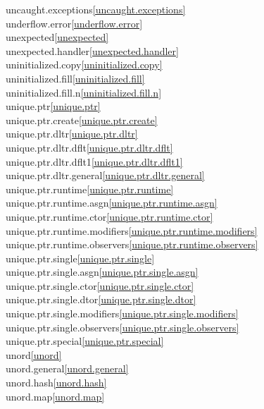 \begin{multicols}{2}
uncaught.exceptions\quad\ref{uncaught.exceptions}\\
underflow.error\quad\ref{underflow.error}\\
unexpected\quad\ref{unexpected}\\
unexpected.handler\quad\ref{unexpected.handler}\\
uninitialized.copy\quad\ref{uninitialized.copy}\\
uninitialized.fill\quad\ref{uninitialized.fill}\\
uninitialized.fill.n\quad\ref{uninitialized.fill.n}\\
unique.ptr\quad\ref{unique.ptr}\\
unique.ptr.create\quad\ref{unique.ptr.create}\\
unique.ptr.dltr\quad\ref{unique.ptr.dltr}\\
unique.ptr.dltr.dflt\quad\ref{unique.ptr.dltr.dflt}\\
unique.ptr.dltr.dflt1\quad\ref{unique.ptr.dltr.dflt1}\\
unique.ptr.dltr.general\quad\ref{unique.ptr.dltr.general}\\
unique.ptr.runtime\quad\ref{unique.ptr.runtime}\\
unique.ptr.runtime.asgn\quad\ref{unique.ptr.runtime.asgn}\\
unique.ptr.runtime.ctor\quad\ref{unique.ptr.runtime.ctor}\\
unique.ptr.runtime.modifiers\quad\ref{unique.ptr.runtime.modifiers}\\
unique.ptr.runtime.observers\quad\ref{unique.ptr.runtime.observers}\\
unique.ptr.single\quad\ref{unique.ptr.single}\\
unique.ptr.single.asgn\quad\ref{unique.ptr.single.asgn}\\
unique.ptr.single.ctor\quad\ref{unique.ptr.single.ctor}\\
unique.ptr.single.dtor\quad\ref{unique.ptr.single.dtor}\\
unique.ptr.single.modifiers\quad\ref{unique.ptr.single.modifiers}\\
unique.ptr.single.observers\quad\ref{unique.ptr.single.observers}\\
unique.ptr.special\quad\ref{unique.ptr.special}\\
unord\quad\ref{unord}\\
unord.general\quad\ref{unord.general}\\
unord.hash\quad\ref{unord.hash}\\
unord.map\quad\ref{unord.map}\\

\end{multicols}
